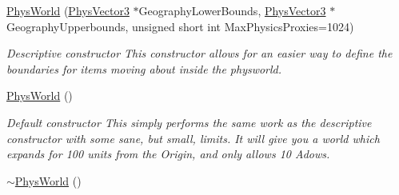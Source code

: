 \begin{DoxyCompactItemize}
\item 
\hyperlink{classPhysWorld_a3228c98369082139722d3c918d735e6c}{PhysWorld} (\hyperlink{classPhysVector3}{PhysVector3} $\ast$GeographyLowerBounds, \hyperlink{classPhysVector3}{PhysVector3} $\ast$GeographyUpperbounds, unsigned short int MaxPhysicsProxies=1024)
\begin{DoxyCompactList}\small\item\em Descriptive constructor This constructor allows for an easier way to define the boundaries for items moving about inside the physworld. \item\end{DoxyCompactList}\item 
\hypertarget{classPhysWorld_a6ded8026b0cd72e7877830698197adf0}{
\hyperlink{classPhysWorld_a6ded8026b0cd72e7877830698197adf0}{PhysWorld} ()}
\label{db/df5/classPhysWorld_a6ded8026b0cd72e7877830698197adf0}

\begin{DoxyCompactList}\small\item\em Default constructor This simply performs the same work as the descriptive constructor with some sane, but small, limits. It will give you a world which expands for 100 units from the Origin, and only allows 10 Adows. \item\end{DoxyCompactList}\item 
\hypertarget{classPhysWorld_acdfe3b4c1c236860dc7dff945cfe5b07}{
\hyperlink{classPhysWorld_acdfe3b4c1c236860dc7dff945cfe5b07}{$\sim$PhysWorld} ()}
\label{db/df5/classPhysWorld_acdfe3b4c1c236860dc7dff945cfe5b07}


\end{DoxyCompactItemize}
